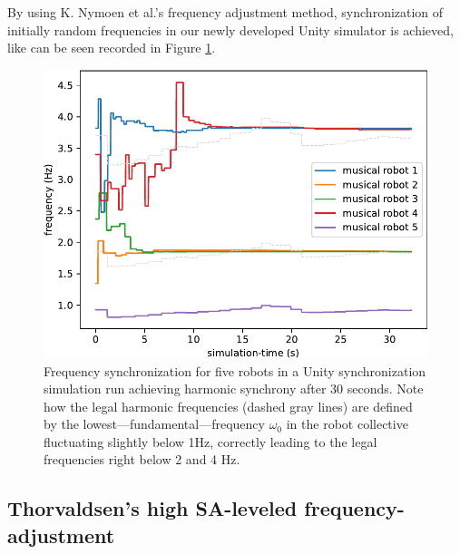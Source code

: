 	By using K. Nymoen et al.'s frequency adjustment method, synchronization of initially random frequencies in our newly developed Unity simulator is achieved, like can be seen recorded in Figure \ref{fig:frequency_synch}.
	
	\begin{figure}
		\centering
		\includegraphics[width=\linewidth]{Assets/DocSegments/Chapters/Implementation/Figures/Plots/FrequencySynchronizationPlot.pdf}
		\caption{Frequency synchronization for five robots in a Unity synchronization simulation run achieving harmonic synchrony after 30 seconds. Note how the legal harmonic frequencies (dashed gray lines) are defined by the lowest—fundamental—frequency $\omega_0$ in the robot collective fluctuating slightly below 1Hz, correctly leading to the legal frequencies right below 2 and 4 Hz.}
		\label{fig:frequency_synch}
	\end{figure}
	
	
	\subsection{Thorvaldsen's high SA-leveled frequency-adjustment}
	
